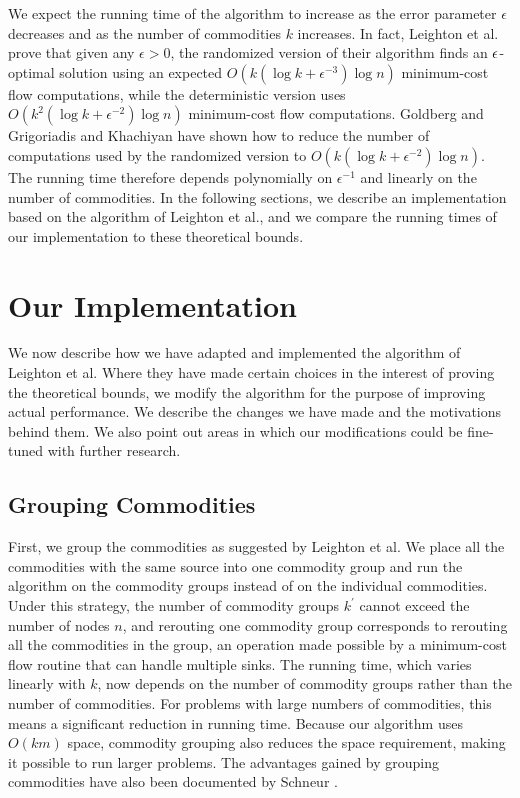 We expect the running time of the algorithm to increase 
as the error parameter $\epsilon$ decreases and 
as the number of commodities $k$ increases.
In fact, Leighton et al. prove that given any $\epsilon > 0$, 
the randomized version of their algorithm finds an $\epsilon$-optimal
solution using an expected 
$O(k(\log k + \epsilon ^{-3}) \log n)$ minimum-cost flow computations,
while the deterministic version uses 
$O(k^2(\log k + \epsilon ^{-2})\log n)$ minimum-cost flow computations.
Goldberg \cite{Goldberg91} and Grigoriadis and Khachiyan
\cite{GrigoriadisK91} have shown 
how to reduce the number of computations used by the randomized version 
to $O(k(\log k + \epsilon ^{-2}) \log n)$.
The running time therefore depends polynomially on $\epsilon ^{-1}$ and
linearly on the number of commodities.
In the following sections, we describe an implementation based on 
the algorithm of Leighton et al., 
and we compare the running times of our implementation to these 
theoretical bounds.

\section{Our Implementation}
\label{sec:implementation}
We now describe how we have adapted and implemented the algorithm 
of Leighton et al.
Where they have made certain choices in the interest of proving the
theoretical bounds, we modify the algorithm for the purpose of improving
actual performance.
We describe the changes we have made and the motivations behind them.
We also point out areas in which our modifications could be fine-tuned
with further research.

\subsection{Grouping Commodities}
First, we group the commodities as suggested by Leighton et al.
We place all the commodities with the same source into one commodity group
and run the algorithm 
on the commodity groups instead of on the individual commodities.
Under this strategy, the number of commodity groups $k^{\prime}$ cannot
exceed the number of nodes $n$, 
and rerouting one commodity group corresponds to rerouting all the
commodities in the group, an operation made possible by
a minimum-cost flow routine that can handle multiple sinks.
The running time, which varies linearly with $k$, 
now depends on the number of commodity groups 
rather than the number of commodities.
For problems with large numbers of commodities,
this means a significant reduction in running time.
Because our algorithm uses $O(km)$ space, 
commodity grouping also reduces the space requirement, 
making it possible to run larger problems.
The advantages gained by grouping commodities have also been documented
by Schneur \cite{Schneur91}.

